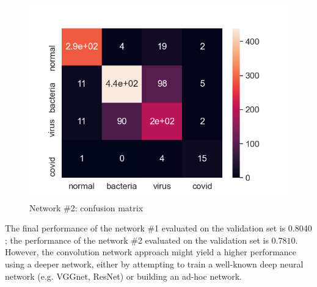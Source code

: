 \documentclass[10pt,a4paper,twocolumn]{article}
\begin{document}
\begin{figure}
    \centering \includegraphics[width=\linewidth]{dnn_confusion}
    \caption{Network \#2: confusion matrix}
\end{figure}

The final performance of the network \#1 evaluated on the validation set is $0.8040$; the performance of the network \#2 evaluated on the validation set is $0.7810$.
However, the convolution network approach might yield a higher performance using a deeper network, either by attempting to train a well-known deep neural network (e.g. VGGnet, ResNet) or building an ad-hoc network.

%
%
\end{document}
